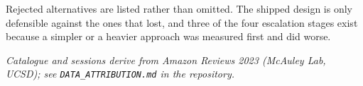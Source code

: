 \documentclass[11pt,a4paper]{article}
\newcommand{\lead}[1]{{\itshape\color{muted}#1}\par}
\begin{document}
Rejected alternatives are listed rather than omitted. The shipped design is only defensible against the ones that lost, and three of the four escalation stages exist because a simpler or a heavier approach was measured first and did worse.

\lead{Catalogue and sessions derive from Amazon Reviews 2023 (McAuley Lab, UCSD); see \texttt{DATA\_\allowbreak ATTRIBUTION\allowbreak .md} in the repository.}
\end{document}
